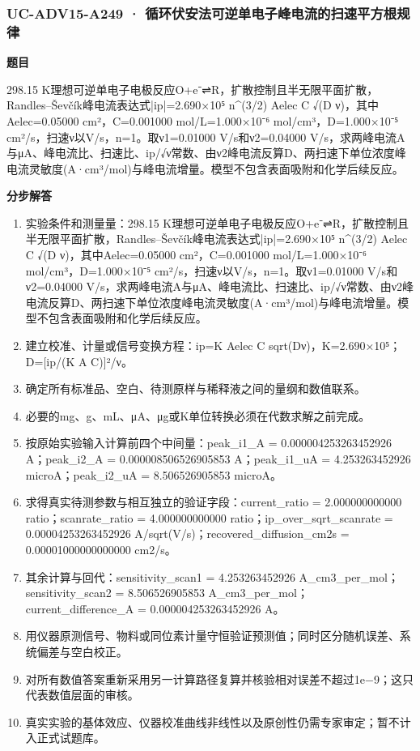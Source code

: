 \documentclass[UTF8,11pt,a4paper]{ctexart}
\begin{document}
\subsubsection*{UC-ADV15-A249 · 循环伏安法可逆单电子峰电流的扫速平方根规律}
\noindent\textbf{题目}\par
298.15 K理想可逆单电子电极反应O+e⁻⇌R，扩散控制且半无限平面扩散，Randles–Ševčík峰电流表达式|ip|=2.690×10⁵ n\textasciicircum{}(3/2) Aelec C √(D ν)，其中Aelec=0.05000 cm²，C=0.001000 mol/L=1.000×10⁻⁶ mol/cm³，D=1.000×10⁻⁵ cm²/s，扫速ν以V/s，n=1。取ν1=0.01000 V/s和ν2=0.04000 V/s，求两峰电流A与μA、峰电流比、扫速比、ip/√ν常数、由ν2峰电流反算D、两扫速下单位浓度峰电流灵敏度(A·cm³/mol)与峰电流增量。模型不包含表面吸附和化学后续反应。\par
\medskip\noindent\textbf{分步解答}
\begin{enumerate}
\item 实验条件和测量量：298.15 K理想可逆单电子电极反应O+e⁻⇌R，扩散控制且半无限平面扩散，Randles–Ševčík峰电流表达式|ip|=2.690×10⁵ n\textasciicircum{}(3/2) Aelec C √(D ν)，其中Aelec=0.05000 cm²，C=0.001000 mol/L=1.000×10⁻⁶ mol/cm³，D=1.000×10⁻⁵ cm²/s，扫速ν以V/s，n=1。取ν1=0.01000 V/s和ν2=0.04000 V/s，求两峰电流A与μA、峰电流比、扫速比、ip/√ν常数、由ν2峰电流反算D、两扫速下单位浓度峰电流灵敏度(A·cm³/mol)与峰电流增量。模型不包含表面吸附和化学后续反应。
\item 建立校准、计量或信号变换方程：ip=K Aelec C sqrt(Dν)，K=2.690×10⁵；D=[ip/(K A C)]²/ν。
\item 确定所有标准品、空白、待测原样与稀释液之间的量纲和数值联系。
\item 必要的mg、g、mL、μA、μg或K单位转换必须在代数求解之前完成。
\item 按原始实验输入计算前四个中间量：peak\_i1\_A = 0.000004253263452926 A；peak\_i2\_A = 0.000008506526905853 A；peak\_i1\_uA = 4.253263452926 microA；peak\_i2\_uA = 8.506526905853 microA。
\item 求得真实待测参数与相互独立的验证字段：current\_ratio = 2.000000000000 ratio；scanrate\_ratio = 4.000000000000 ratio；ip\_over\_sqrt\_scanrate = 0.00004253263452926 A/sqrt(V/s)；recovered\_diffusion\_cm2s = 0.00001000000000000 cm2/s。
\item 其余计算与回代：sensitivity\_scan1 = 4.253263452926 A\_cm3\_per\_mol；sensitivity\_scan2 = 8.506526905853 A\_cm3\_per\_mol；current\_difference\_A = 0.000004253263452926 A。
\item 用仪器原测信号、物料或同位素计量守恒验证预测值；同时区分随机误差、系统偏差与空白校正。
\item 对所有数值答案重新采用另一计算路径复算并核验相对误差不超过1e−9；这只代表数值层面的审核。
\item 真实实验的基体效应、仪器校准曲线非线性以及原创性仍需专家审定；暂不计入正式试题库。
\end{enumerate}
\end{document}
